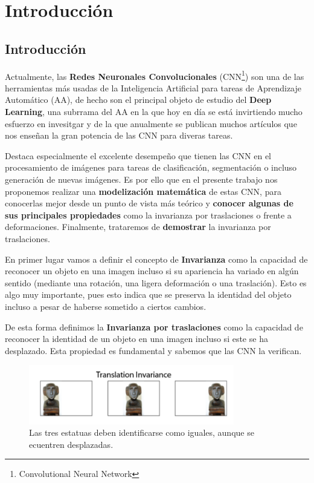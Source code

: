 

\chapter{Introducción}

\section{Introducción}

\noindent Actualmente, las \textbf{Redes Neuronales Convolucionales} (CNN\footnote{Convolutional Neural Network}) son una de las herramientas más usadas de la Inteligencia Artificial para tareas de Aprendizaje Automático (AA), de hecho son el principal objeto de estudio del \textbf{Deep Learning}, una subrrama del AA en la que hoy en día se está invirtiendo mucho esfuerzo en invesitgar y de la que anualmente se publican muchos artículos que nos enseñan la gran potencia de las CNN para diveras tareas.


\medskip

\noindent Destaca especialmente el excelente desempeño que tienen las CNN en el procesamiento de imágenes para tareas de clasificación, segmentación o incluso generación de nuevas imágenes. Es por ello que en el presente trabajo nos proponemos realizar una \textbf{modelización matemática} de estas CNN, para conocerlas mejor desde un punto de vista más teórico y \textbf{conocer algunas de sus principales propiedades} como la invarianza por traslaciones o frente a  deformaciones. Finalmente, trataremos de \textbf{demostrar} la invarianza por traslaciones.

\medskip

\noindent En primer lugar vamos a definir el concepto de \textbf{Invarianza} como la capacidad de reconocer un objeto en una imagen incluso si su apariencia ha variado en algún sentido (mediante una rotación, una  ligera deformación o una traslación). Esto es algo muy importante, pues esto indica que se preserva la identidad del objeto incluso a pesar de haberse sometido a ciertos cambios.

\medskip

\noindent De esta forma definimos la \textbf{Invarianza por traslaciones} como la capacidad de reconocer la identidad de un objeto en una imagen incluso si este se ha desplazado. Esta propiedad es fundamental y sabemos que las CNN la verifican.

\begin{figure} [!h]
    \centering
    \includegraphics[width=0.8\textwidth]{img/translation_invariance.png}
    \caption{Las tres estatuas deben identificarse como iguales, aunque se ecuentren desplazadas.}
    \label{fig:invarianza_traslaciones}
\end{figure}

